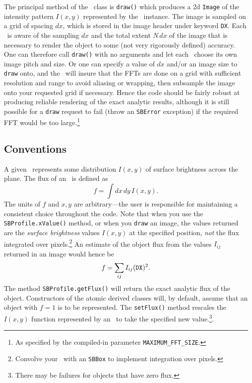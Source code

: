 \documentclass[11pt,preprint,flushrt]{aastex}
\begin{document}
The principal method of the \sbp\ class is {\tt draw()} which produces a 2d {\tt Image} of the intensity pattern $I(x,y)$ represented by the \sbp\ instance.  The image is sampled on a grid of spacing $dx$, which is stored in the image header under keyword {\tt DX}.  Each \sbp\ is aware of the sampling $dx$ and the total extent $N\,dx$ of the image that is necessary to render the object to some (not very rigorously defined) accuracy.  One can therefore call {\tt draw()} with no arguments and let each \sbp\ choose its own image pitch and size.  Or one can specify a value of $dx$ and/or an image size to {\tt draw} onto, and the \sbp\ will insure that the FFTs are done on a grid with sufficient resolution and range to avoid aliasing or wrapping, then subsample the image onto your requested grid if necessary.  Hence the code should be fairly robust at producing reliable rendering of the exact analytic results, although it is still possible for a {\tt draw} request to fail (throw an {\tt SBError} exception) if the required FFT would be too large.\footnote{As specified by the compiled-in parameter {\tt MAXIMUM\_FFT\_SIZE}.}

\subsection{Conventions}
A given \sbp\ represents some distribution $I(x,y)$ of surface brightness across the plane.   The flux of an \sbp\ is defined as
\begin{equation}
f = \int dx\,dy\, I(x,y).
\end{equation}
The units of $f$ and $x,y$ are arbitrary---the user is responsible for maintaining a consistent choice throughout the code.  Note that when you use the {\tt SBProfile.xValue()} method, or when you {\tt draw} an image, the values returned are the {\em surface brightness} values $I(x,y)$ at the specified position, {\em not} the flux integrated over pixels.\footnote{Convolve your \sbp\ with an {\tt SBBox} to implement integration over pixels.}  An estimate of the object flux from the values $I_{ij}$ returned in an image would hence be
\begin{equation}
f = \sum_{ij} I_{ij} ({\tt DX})^2.
\end{equation}
The method {\tt SBProfile.getFlux()} will return the exact analytic flux of the object.  Constructors of the atomic derived classes will, by default, assume that an object with $f=1$ is to be represented.  The {\tt setFlux()} method rescales the $I(x,y)$ function represented by an \sbp\ to take the specified new value.\footnote{There may be failures for objects that have zero flux.}.
\end{document}
